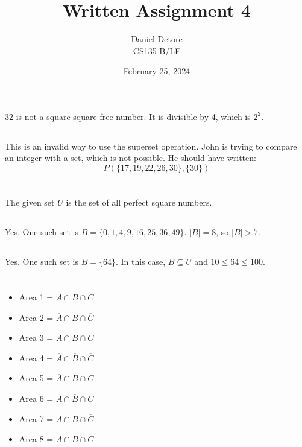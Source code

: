 \documentclass{article}
\title{Written Assignment 4}
\author{Daniel Detore\\CS135-B/LF}
\date{February 25, 2024}
\begin{document}
\maketitle

\section{}
\subsection{}
32 is not a square square-free number. It is divisible by 4, which is $ 2^2 $. 

\subsection{}
This is an invalid way to use the superset operation. John is trying to compare an integer with a set, which is not possible. He should have written:
\begin{equation*}
P (\{17, 19, 22, 26, 30\}, \{30\})
\end{equation*}

\section{}
The given set $U$ is the set of all perfect square numbers.

\subsection{}
Yes. One such set is $B = \{0, 1, 4, 9, 16, 25, 36, 49\}$. $|B| = 8$, so $|B| > 7$.

\subsection{}
Yes. One such set is $B = \{64\}$. In this case, $B \subseteq U$ and $10 \leq 64 \leq 100$.

\section{}
\subsection{}
\begin{itemize}
\item Area 1 = $ \overline{A} \cap \overline{B} \cap C  $
\item Area 2 = $ \overline{A} \cap B \cap \overline{C}  $ 	
\item Area 3 = $ A \cap \overline{B} \cap \overline{C}  $
\item Area 4 = $ \overline{A} \cap \overline{B} \cap \overline{C}$
\item Area 5 = $ \overline{A} \cap B \cap C  $ 
\item Area 6 = $ A \cap \overline{B} \cap C  $
\item Area 7 = $ A \cap B \cap \overline{C}  $
\item Area 8 = $ A \cap B \cap C $
\end{itemize}
\end{document}
